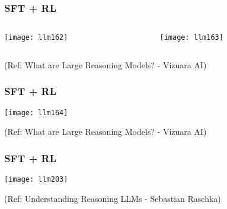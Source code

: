\begin{frame}[fragile]\frametitle{SFT + RL}


\begin{columns}
    \begin{column}[T]{0.5\linewidth}
		\begin{center}
		\texttt{[image: llm162]}
		\end{center}

    \end{column}
    \begin{column}[T]{0.5\linewidth}
		\begin{center}
		\texttt{[image: llm163]}
		\end{center}
    \end{column}
  \end{columns}
  

{\tiny (Ref: What are Large Reasoning Models? - Vizuara AI)}

\end{frame}

\begin{frame}[fragile]\frametitle{SFT + RL}


		\begin{center}
		\texttt{[image: llm164]}
		\end{center}

  

{\tiny (Ref: What are Large Reasoning Models? - Vizuara AI)}

\end{frame}

\begin{frame}[fragile]\frametitle{SFT + RL}

  
  		\begin{center}
		\texttt{[image: llm203]}
		
		{\tiny (Ref: Understanding Reasoning LLMs - Sebastian Raschka)}

		\end{center}

\end{frame}

